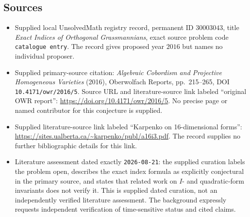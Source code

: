 \documentclass[11pt]{article}
\begin{document}
\subsection{Sources}
\begin{itemize}
\item Supplied local UnsolvedMath registry record, permanent ID \(30003043\), title \emph{Exact Indices of Orthogonal Grassmannians}, exact source problem code \texttt{catalogue entry}. The record gives proposed year \(2016\) but names no individual proposer.
\item Supplied primary-source citation: \emph{Algebraic Cobordism and Projective Homogeneous Varieties} (2016), Oberwolfach Reports, pp.\ 215--265, DOI \texttt{10.4171/owr/2016/5}. Source URL and literature-source link labeled ``original OWR report'': \url{https://doi.org/10.4171/owr/2016/5}. No precise page or named contributor for this conjecture is supplied.
\item Supplied literature-source link labeled ``Karpenko on 16-dimensional forms'': \url{https://sites.ualberta.ca/~karpenko/publ/a16i3.pdf}. The record supplies no further bibliographic details for this link.
\item Literature assessment dated exactly \texttt{2026-08-21}: the supplied curation labels the problem open, describes the exact index formula as explicitly conjectural in the primary source, and states that related work on \(I\)- and quadratic-form invariants does not verify it. This is supplied dated curation, not an independently verified literature assessment. The background expressly requests independent verification of time-sensitive status and cited claims.
\end{itemize}
\end{document}
